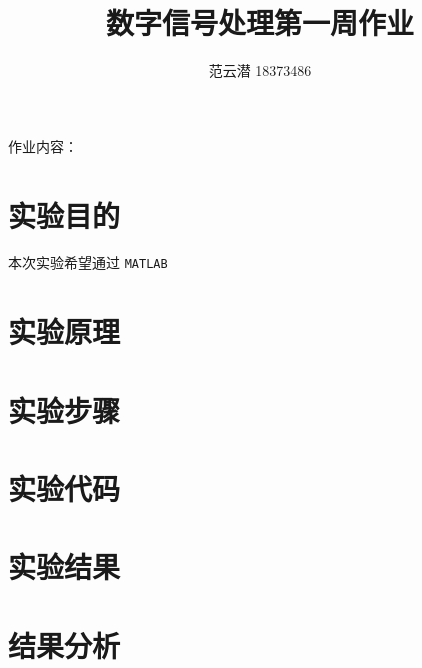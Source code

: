 \documentclass[lang=cn,11pt,a4paper,cite=authoryear]{elegantpaper}
\title{数字信号处理\quad 第一周作业}
\author{范云潜 18373486}
\institute{微电子学院 184111 班}
\date{\zhtoday}
\begin{document}
\maketitle

作业内容：

\tableofcontents




\section{实验目的}

本次实验希望通过 \lstinline{MATLAB}

\section{实验原理}

\section{实验步骤}

\section{实验代码}

\section{实验结果}

\section{结果分析}
\end{document}

